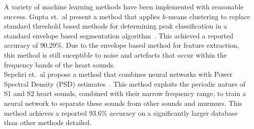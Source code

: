 \documentclass[titlepage, 12pt]{scrartcl} \usepackage{enumitem}
\begin{document}
A variety of machine learning methods have been implemented with reasonable
success. Gupta et.\ al present a method that applies $k$-means clustering to
replace standard threshold based methods for determining peak classification in
a standard envelope based segmentation algorithm~\citeyearpar{Gupta2007}. This achieved a reported
accuracy of 90.29\%. Due to the envelope based method for feature extraction,
this method is still suceptible to noise and artefacts that occur within the
frequency bands of the heart sounds.\\

Sepehri et.\ al propose a method that combines neural networks with Power
Spectral Density (PSD) estimates~\citeyearpar{Sepehri2010}. This method
exploits the periodic nature of S1 and S2 heart sounds, combined with their
narrow frequency range, to train a neural network to separate these sounds from
other sounds and murmurs. This method achieves a reported 93.6\% accuracy on a
significantly larger database than other methods detailed.\\
\end{document}
